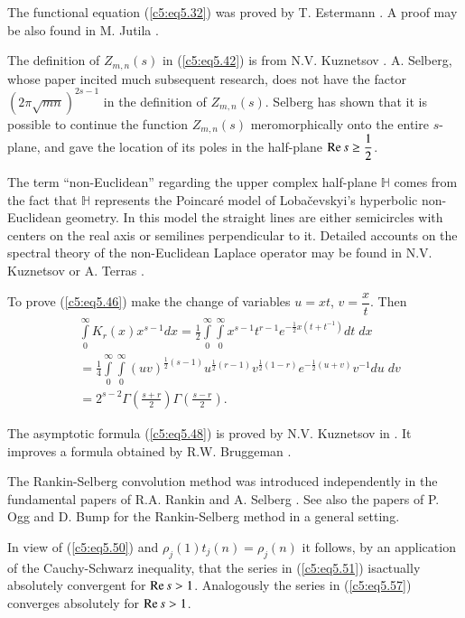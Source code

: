 The functional equation (\ref{c5:eq5.32}) was proved by T. Estermann
\cite{Estermann1}. A proof may be also found in M. Jutila
\cite{Jutila9}. 

The definition of $Z_{m,n} (s)$ in (\ref{c5:eq5.42}) is from
N.V. Kuznetsov \cite{Kuznetsov2}. A. Selberg, whose paper
\cite{Selberg2} incited much subsequent research, does not have the
factor $(2\pi\sqrt{mn})^{2s-1}$ in the definition of $Z_{m,n}
(s)$. Selberg has shown that it is possible to continue the function
$Z_{m,n}(s)$ meromorphically onto the entire $s$-plane, and gave the
location of its poles in the half-plane $\operatorname{Re} s \geq \dfrac{1}{2}$. 

The term ``non-Euclidean'' regarding the upper complex half-plane
$\mathbb{H}$ comes from the fact that $\mathbb{H}$ represents the
Poincar\'e model of Loba\v cev\-skyi's hyperbolic non-Euclidean
geometry. In this model the straight lines are either semicircles with
centers on the real axis or semilines perpendicular to it. Detailed
accounts on the spectral theory of the non-Euclidean Laplace operator
may be found in N.V. Kuznetsov \cite{Kuznetsov2} or A. Terras
\cite{Terras1}. 

To prove (\ref{c5:eq5.46}) make the change of variables $u = xt$, $v
=\dfrac{x}{t}$. Then 
\begin{align*}
& \int\limits^\infty_0 K_r (x) x^{s-1} dx = \frac{1}{2}
  \int\limits^\infty_0  \int\limits^\infty_0 x^{s-1} t^{r-1}
  e^{-\frac{1}{2} x(t+t^{-1})} dt \; dx\\ 
& = \frac{1}{4} \int\limits^\infty_0 \int\limits^{\infty}_0
  (uv)^{\frac{1}{2} (s-1)} u^{\frac{1}{2} (r-1)} v^{\frac{1}{2} (1-r)}
  e^{-\frac{1}{2} (u+v)} v^{-1} du \; dv\\ 
& = 2^{s-2} \Gamma \left(\frac{s+r}{2} \right) \Gamma
  \left(\frac{s-r}{2} \right). 
\end{align*}

The asymptotic formula (\ref{c5:eq5.48}) is proved by N.V. Kuznetsov
in \cite{Kuznetsov2}. It improves a formula obtained by R.W. Bruggeman
\cite{Bruggeman1}. 

The Rankin-Selberg convolution method was introduced independently in
the fundamental papers of R.A. Rankin \cite{Rankin1} and A. Selberg
\cite{Selberg1}. See also the papers of P. Ogg \cite{Ogg1} and D. Bump
\cite{Bump2} for the Rankin-Selberg method in a general setting. 

In view of (\ref{c5:eq5.50}) and $\rho_j(1) t_j(n) = \rho_j(n)$ it
follows, by an application of the Cauchy-Schwarz inequality, that the
series in (\ref{c5:eq5.51}) is\pageoriginale actually absolutely
convergent for $\operatorname{Re} s >1$. Analogously the series in (\ref{c5:eq5.57})
converges absolutely for $\operatorname{Re} s > 1$.  


